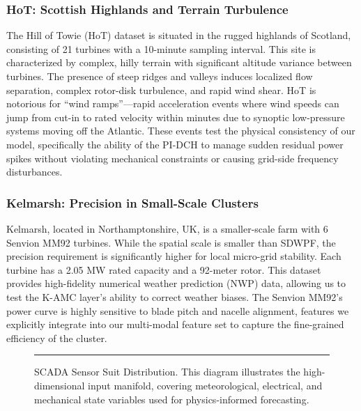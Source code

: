 \subsubsection{HoT: Scottish Highlands and Terrain Turbulence}
\label{sec:hot}
The Hill of Towie (HoT) dataset is situated in the rugged highlands of Scotland, consisting of 21 turbines with a 10-minute sampling interval. This site is characterized by complex, hilly terrain with significant altitude variance between turbines. The presence of steep ridges and valleys induces localized flow separation, complex rotor-disk turbulence, and rapid wind shear. HoT is notorious for ``wind ramps''---rapid acceleration events where wind speeds can jump from cut-in to rated velocity within minutes due to synoptic low-pressure systems moving off the Atlantic. These events test the physical consistency of our model, specifically the ability of the PI-DCH to manage sudden residual power spikes without violating mechanical constraints or causing grid-side frequency disturbances.

\subsubsection{Kelmarsh: Precision in Small-Scale Clusters}
\label{sec:kelmarsh}
Kelmarsh, located in Northamptonshire, UK, is a smaller-scale farm with 6 Senvion MM92 turbines. While the spatial scale is smaller than SDWPF, the precision requirement is significantly higher for local micro-grid stability. Each turbine has a 2.05 MW rated capacity and a 92-meter rotor. This dataset provides high-fidelity numerical weather prediction (NWP) data, allowing us to test the K-AMC layer's ability to correct weather biases. The Senvion MM92's power curve is highly sensitive to blade pitch and nacelle alignment, features we explicitly integrate into our multi-modal feature set to capture the fine-grained efficiency of the cluster.

\begin{figure}[!t]
\centering
\rule{0.48\textwidth}{0.35\textwidth}
\caption{SCADA Sensor Suit Distribution. This diagram illustrates the high-dimensional input manifold, covering meteorological, electrical, and mechanical state variables used for physics-informed forecasting.}
\label{fig:sensors}
\end{figure}

